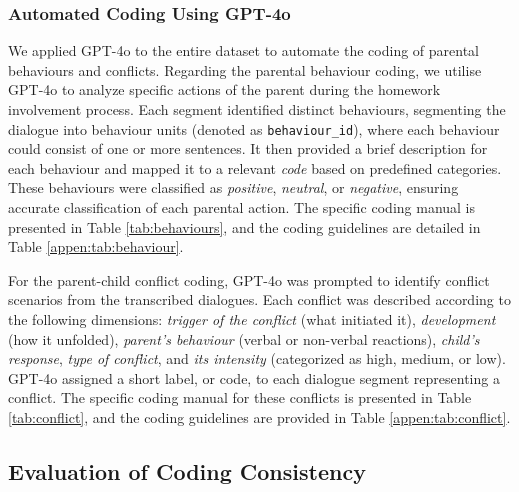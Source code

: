 
\subsubsection{Automated Coding Using GPT-4o}
We applied GPT-4o to the entire dataset to automate the coding of parental behaviours and conflicts. Regarding the parental behaviour coding, we utilise GPT-4o to analyze specific actions of the parent during the homework involvement process. Each segment identified distinct behaviours, segmenting the dialogue into behaviour units (denoted as \texttt{behaviour\_id}), where each behaviour could consist of one or more sentences. It then provided a brief description for each behaviour and mapped it to a relevant \textit{code} based on predefined categories. These behaviours were classified as \textit{positive}, \textit{neutral}, or \textit{negative}, ensuring accurate classification of each parental action. The specific coding manual is presented in Table \ref{tab:behaviours}, and the coding guidelines are detailed in Table \ref{appen:tab:behaviour}.


For the parent-child conflict coding, GPT-4o was prompted to identify conflict scenarios from the transcribed dialogues. Each conflict was described according to the following dimensions: \textit{trigger of the conflict}  (what initiated it), \textit{development} (how it unfolded), \textit{parent’s behaviour} (verbal or non-verbal reactions), \textit{child’s response}, \textit{type of conflict}, and \textit{its intensity} (categorized as high, medium, or low). GPT-4o assigned a short label, or code, to each dialogue segment representing a conflict. The specific coding manual for these conflicts is presented in Table \ref{tab:conflict}, and the coding guidelines are provided in Table \ref{appen:tab:conflict}.






\subsection{Evaluation of Coding Consistency}

